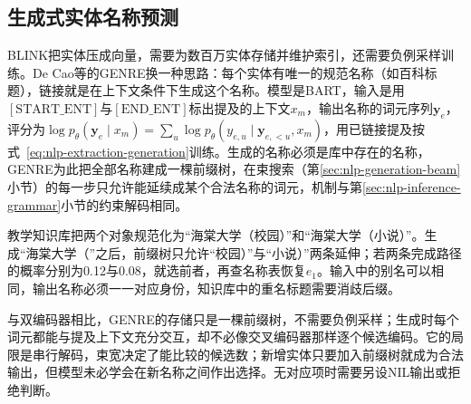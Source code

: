 \subsection{生成式实体名称预测}
\label{sec:nlp-extraction-generative-linking}

BLINK把实体压成向量，需要为数百万实体存储并维护索引，还需要负例采样训练。De Cao等的GENRE换一种思路：每个实体有唯一的规范名称（如百科标题），链接就是在上下文条件下生成这个名称。模型是BART，输入是用$[\mathrm{START\_ENT}]$与$[\mathrm{END\_ENT}]$标出提及的上下文$x_m$，输出名称的词元序列$\bm y_e$，评分为$\log p_\theta(\bm y_e\mid x_m)=\sum_u\log p_\theta(y_{e,u}\mid\bm y_{e,<u},x_m)$，用已链接提及按式~\eqref{eq:nlp-extraction-generation}训练。生成的名称必须是库中存在的名称，GENRE为此把全部名称建成一棵前缀树，在束搜索（第\ref{sec:nlp-generation-beam}小节）的每一步只允许能延续成某个合法名称的词元，机制与第\ref{sec:nlp-inference-grammar}小节的约束解码相同。

教学知识库把两个对象规范化为“海棠大学（校园）”和“海棠大学（小说）”。生成“海棠大学（”之后，前缀树只允许“校园）”与“小说）”两条延伸；若两条完成路径的概率分别为0.12与0.08，就选前者，再查名称表恢复$e_1$。输入中的别名可以相同，输出名称必须一一对应身份，知识库中的重名标题需要消歧后缀。

与双编码器相比，GENRE的存储只是一棵前缀树，不需要负例采样；生成时每个词元都能与提及上下文充分交互，却不必像交叉编码器那样逐个候选编码。它的局限是串行解码，束宽决定了能比较的候选数；新增实体只要加入前缀树就成为合法输出，但模型未必学会在新名称之间作出选择。无对应项时需要另设NIL输出或拒绝判断。
